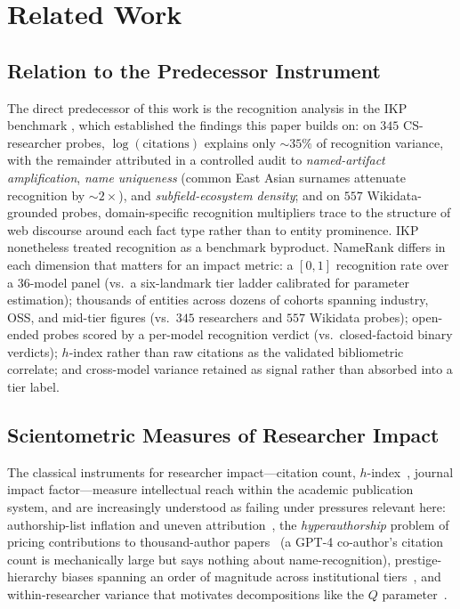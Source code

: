 \documentclass[11pt]{article}
\begin{document}
\section{Related Work}
\label{sec:related}

\subsection{Relation to the Predecessor Instrument}

The direct predecessor of this work is the recognition analysis in the IKP benchmark \citep[\S5.7]{li2026ikp}, which established the findings this paper builds on: on $345$ CS-researcher probes, $\log(\text{citations})$ explains only ${\sim}35\%$ of recognition variance, with the remainder attributed in a controlled audit to \emph{named-artifact amplification}, \emph{name uniqueness} (common East Asian surnames attenuate recognition by ${\sim}2\times$), and \emph{subfield-ecosystem density}; and on $557$ Wikidata-grounded probes, domain-specific recognition multipliers trace to the structure of web discourse around each fact type rather than to entity prominence. IKP nonetheless treated recognition as a benchmark byproduct. NameRank differs in each dimension that matters for an impact metric: a $[0,1]$ recognition rate over a $36$-model panel (vs.\ a six-landmark tier ladder calibrated for parameter estimation); thousands of entities across dozens of cohorts spanning industry, OSS, and mid-tier figures (vs.\ $345$ researchers and $557$ Wikidata probes); open-ended probes scored by a per-model recognition verdict (vs.\ closed-factoid binary verdicts); $h$-index rather than raw citations as the validated bibliometric correlate; and cross-model variance retained as signal rather than absorbed into a tier label.

\subsection{Scientometric Measures of Researcher Impact}

The classical instruments for researcher impact---citation count, $h$-index~\citep{hirsch2005index}, journal impact factor---measure intellectual reach within the academic publication system, and are increasingly understood as failing under pressures relevant here: authorship-list inflation and uneven attribution~\citep{lariviere2019}, the \emph{hyperauthorship} problem of pricing contributions to thousand-author papers~\citep{cronin2001hyperauthorship} (a GPT-4 co-author's citation count is mechanically large but says nothing about name-recognition), prestige-hierarchy biases spanning an order of magnitude across institutional tiers~\citep{wapman2022quantifying}, and within-researcher variance that motivates decompositions like the $Q$ parameter~\citep{sinatra2016quantifying}.
\end{document}
